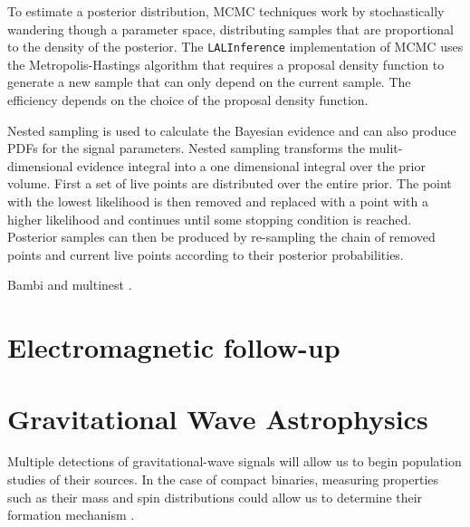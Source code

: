 \documentclass[letterpaper, aps, prd, superscriptaddress, showpacs, nofootinbib]{revtex4}
\begin{document}
To estimate a posterior distribution, MCMC techniques work by stochastically wandering though a parameter space, distributing samples that are proportional to the density of the posterior.  The \texttt{LALInference} implementation of MCMC uses the Metropolis-Hastings algorithm that requires a proposal density function to generate a new sample that can only depend on the current sample. The efficiency depends on the choice of the proposal density function. 

Nested sampling is used to calculate the Bayesian evidence and can also produce PDFs for the signal parameters. Nested sampling transforms the mulit-dimensional evidence integral into a one dimensional integral over the prior volume. First a set of live points are distributed over the entire prior. The point with the lowest likelihood is then removed and replaced with a point with a higher likelihood and continues until some stopping condition is reached. Posterior samples can then be produced by re-sampling the chain of removed points and current live points according to their posterior probabilities.

Bambi \cite{2012MNRAS.421..169G} and multinest \cite{2009MNRAS.398.1601F}.

\section{Electromagnetic follow-up}
\label{sec:em}


\section{Gravitational Wave Astrophysics}
\label{sec:gw_astro}

Multiple detections of gravitational-wave signals will allow us to begin population studies of their sources.
In the case of compact binaries, measuring properties such as their mass and spin distributions could allow 
us to determine their formation mechanism \cite{0264-9381-27-11-114007, 2017Natur.548..426F, 2017MNRAS.471.2801S, 2015ApJ...810...58S, 0264-9381-34-3-03LT01, 2017PhRvD..95l4046G, 2018arXiv180102699T}.

\end{document}
